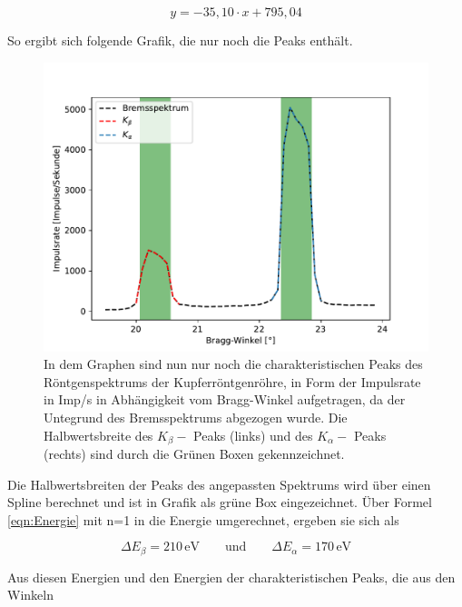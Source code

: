 \documentclass[titlepage = firstcover]{scrartcl}
\begin{document}
            \begin{equation*}
              y = -35,10 \cdot x + 795,04
            \end{equation*}

            \noindent
            So ergibt sich folgende Grafik, die nur noch die Peaks enthält.
            \FloatBarrier
            \begin{figure}[h]
              \centering
              \includegraphics{Peaks_Cu.pdf}
              \caption{In dem Graphen sind nun nur noch die charakteristischen Peaks des Röntgenspektrums der Kupferröntgenröhre, in Form der Impulsrate in Imp/s in Abhängigkeit vom Bragg-Winkel aufgetragen, da der Untegrund des Bremsspektrums abgezogen wurde. Die Halbwertsbreite des $K_{\beta}-$ Peaks (links) und des $K_{\alpha}-$ Peaks (rechts) sind durch die Grünen Boxen gekennzeichnet.}
              \label{fig:graphpeak}
            \end{figure}
            \FloatBarrier
            \noindent
            Die Halbwertsbreiten der Peaks des angepassten Spektrums wird über einen Spline berechnet und ist in Grafik als grüne Box eingezeichnet. Über Formel \ref{eqn:Energie} mit n=1 in die 
            Energie umgerechnet, ergeben sie sich als 

            \begin{equation*}
              \Delta E_{\beta} = 210 \, \text{eV} \qquad \text{und} \qquad \Delta E_{\alpha} = 170 \, \text{eV}
              \label{eqn:Breiten}
            \end{equation*}
            
            \noindent
            Aus diesen Energien und den Energien der charakteristischen Peaks, die aus den Winkeln
\end{document}
